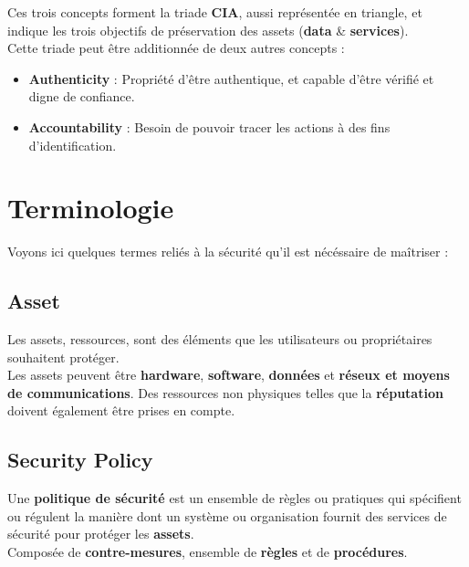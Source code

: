 \documentclass{report}
\begin{document}
		Ces trois concepts forment la triade \textbf{CIA}, aussi représentée en triangle, et indique les trois objectifs de préservation des assets (\textbf{data} \& \textbf{services}).\\
		Cette triade peut être additionnée de deux autres concepts : \\

		\begin{itemize}
			\item \textbf{Authenticity} : Propriété d'être authentique, et capable d'être vérifié et digne de confiance.\\
			\item \textbf{Accountability} : Besoin de pouvoir tracer les actions à des fins d'identification.\\
		\end{itemize}

	\section{Terminologie}

		Voyons ici quelques termes reliés à la sécurité qu'il est nécéssaire de maîtriser : \\

		\subsection{Asset}

			Les assets, ressources, sont des éléments que les utilisateurs ou propriétaires souhaitent protéger.\\

			Les assets peuvent être \textbf{hardware}, \textbf{software}, \textbf{données} et \textbf{réseux et moyens de communications}. Des ressources non physiques telles que la \textbf{réputation} doivent également être prises en compte.\\

		\subsection{Security Policy}

			Une \textbf{politique de sécurité} est un ensemble de règles ou pratiques qui spécifient ou régulent la manière dont un système ou organisation fournit des services de sécurité pour protéger les \textbf{assets}.\\

			Composée de \textbf{contre-mesures}, ensemble de \textbf{règles} et de \textbf{procédures}.\\
\end{document}
